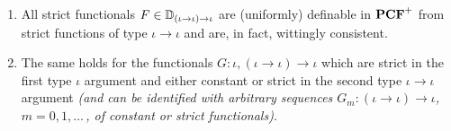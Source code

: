 \documentclass[fleqn]{LMCS}
\theoremstyle{plain}\newtheorem{satz}[thm]{Satz}
\theoremstyle{plain}\newtheorem{hyp}[thm]{Hypothesis}
\theoremstyle{plain}\newtheorem{hyps}[thm]{Hypotheses}
\theoremstyle{definition}\newtheorem{note}[thm]{Note}
\newcommand{\arr}{\rightarrow}
\newcommand{\PCF}{\mbox{\bf PCF}}
\newcommand{\?}{\mbox{?}}
\begin{document}
\begin{lem}\label{lemma:strict-def}\hfill
\begin{enumerate}[\em(a)]
\item All strict functionals $F\in \bbD_{(\iota\arr\iota)\arr\iota}$ are 
(uniformly) definable in $\PCF^+$ from strict 
functions of type 
$\iota\arr\iota$ and are, in fact, wittingly consistent. 

\item The same holds for the functionals 
$G:\iota,(\iota\arr\iota)\arr\iota$ 
which are strict in the first type $\iota$ argument 
and either constant or strict in the second 
type \mbox{$\iota\arr\iota$} argument
{\em(and can be identified with arbitrary sequences 
$G_m:(\iota\arr\iota)\arr\iota$, 
$m=0,1,\ldots\,$, of constant or strict functionals)}. 
\end{enumerate}
\end{lem}
\end{document}
